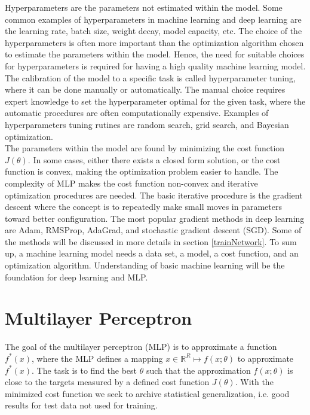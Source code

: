 Hyperparameters are the parameters not estimated within the model. Some common examples of hyperparameters in machine learning and deep learning are the learning rate, batch size, weight decay, model capacity, etc. The choice of the hyperparameters is often more important than the optimization algorithm chosen to estimate the parameters within the model. Hence, the need for suitable choices for hyperparameters is required for having a high quality machine learning model. The calibration of the model to a specific task is called hyperparameter tuning, where it can be done manually or automatically. The manual choice requires expert knowledge to set the hyperparameter optimal for the given task, where the automatic procedures are often computationally expensive. Examples of hyperparameters tuning rutines are random search, grid search, and Bayesian optimization.\\

The parameters within the model are found by minimizing the cost function $J(\theta)$. In some cases, either there exists a closed form solution, or the cost function is convex, making the optimization problem easier to handle. The complexity of MLP makes the cost function non-convex and iterative optimization procedures are needed. The basic iterative procedure is the gradient descent where the concept is to repeatedly make small moves in parameters toward better configuration. The most popular gradient methods in deep learning are Adam, RMSProp, AdaGrad, and stochastic gradient descent (SGD). Some of the methods will be discussed in more details in section \ref{trainNetwork}. To sum up, a machine learning model needs a data set, a model, a cost function, and an optimization algorithm. Understanding of basic machine learning will be the foundation for deep learning and MLP.



\section{Multilayer Perceptron}\label{multilayerPerceptron}
The goal of the multilayer perceptron (MLP) is to approximate a function $f^*(x)$, where the MLP defines a mapping $x\in \mathbb{R}^R \mapsto f(x;\theta)$ to approximate $f^*(x)$. The task is to find the best $\theta$ such that the approximation $f(x;\theta)$ is close to the targets measured by a defined cost function $J(\theta)$. With the minimized cost function we seek to archive statistical generalization, i.e. good results for test data not used for training. \\

